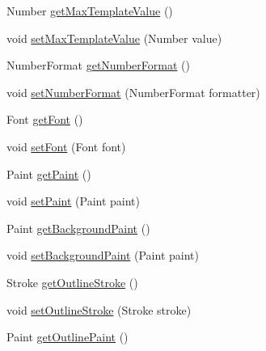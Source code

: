 \begin{DoxyCompactItemize}
\item 
Number \mbox{\hyperlink{classorg_1_1jfree_1_1chart_1_1plot_1_1dial_1_1_dial_value_indicator_a101533e3bd8a775d29348f204da5e76d}{get\+Max\+Template\+Value}} ()
\item 
void \mbox{\hyperlink{classorg_1_1jfree_1_1chart_1_1plot_1_1dial_1_1_dial_value_indicator_a8d237840259511c2cff7e6872cf34dfe}{set\+Max\+Template\+Value}} (Number value)
\item 
Number\+Format \mbox{\hyperlink{classorg_1_1jfree_1_1chart_1_1plot_1_1dial_1_1_dial_value_indicator_a3c320a660cacb2e7ed3abca17f2ff0f0}{get\+Number\+Format}} ()
\item 
void \mbox{\hyperlink{classorg_1_1jfree_1_1chart_1_1plot_1_1dial_1_1_dial_value_indicator_a7284f6333acb1edee3217d2fef2902ce}{set\+Number\+Format}} (Number\+Format formatter)
\item 
Font \mbox{\hyperlink{classorg_1_1jfree_1_1chart_1_1plot_1_1dial_1_1_dial_value_indicator_a21a668914ec4c335dd57b6026d1b272a}{get\+Font}} ()
\item 
void \mbox{\hyperlink{classorg_1_1jfree_1_1chart_1_1plot_1_1dial_1_1_dial_value_indicator_adacfbbcb8506fadca263056f4e062e28}{set\+Font}} (Font font)
\item 
Paint \mbox{\hyperlink{classorg_1_1jfree_1_1chart_1_1plot_1_1dial_1_1_dial_value_indicator_a5786836e013fbace6842f0bd4f1947c0}{get\+Paint}} ()
\item 
void \mbox{\hyperlink{classorg_1_1jfree_1_1chart_1_1plot_1_1dial_1_1_dial_value_indicator_a074b7cfef60b10d87247af98145343e2}{set\+Paint}} (Paint paint)
\item 
Paint \mbox{\hyperlink{classorg_1_1jfree_1_1chart_1_1plot_1_1dial_1_1_dial_value_indicator_a23efc254350c58403200408b76bfa76b}{get\+Background\+Paint}} ()
\item 
void \mbox{\hyperlink{classorg_1_1jfree_1_1chart_1_1plot_1_1dial_1_1_dial_value_indicator_a4dae61c463927eda13f4c4ac7dbcc93d}{set\+Background\+Paint}} (Paint paint)
\item 
Stroke \mbox{\hyperlink{classorg_1_1jfree_1_1chart_1_1plot_1_1dial_1_1_dial_value_indicator_a34fd531229415c9f123614761f91aefa}{get\+Outline\+Stroke}} ()
\item 
void \mbox{\hyperlink{classorg_1_1jfree_1_1chart_1_1plot_1_1dial_1_1_dial_value_indicator_a011518ddf643ceb484fc659d46875123}{set\+Outline\+Stroke}} (Stroke stroke)
\item 
Paint \mbox{\hyperlink{classorg_1_1jfree_1_1chart_1_1plot_1_1dial_1_1_dial_value_indicator_ac6b32663e40d0974847158407e09557a}{get\+Outline\+Paint}} ()

\end{DoxyCompactItemize}
